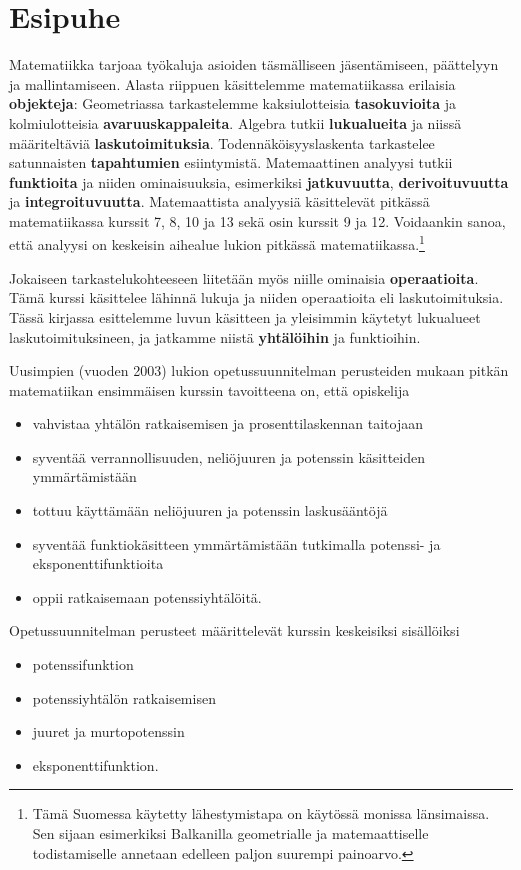 
\chapter{Esipuhe}

Matematiikka tarjoaa työkaluja asioiden täsmälliseen jäsentämiseen, päättelyyn ja mallintamiseen. Alasta riippuen käsittelemme matematiikassa erilaisia \textbf{objekteja}: Geometriassa tarkastelemme kaksiulotteisia \textbf{tasokuvioita} ja kolmiulotteisia \textbf{avaruuskappaleita}. Algebra tutkii \textbf{lukualueita} ja niissä määriteltäviä \textbf{laskutoimituksia}. Todennäköisyyslaskenta tarkastelee satunnaisten \textbf{tapahtumien} esiintymistä. Matemaattinen analyysi tutkii \textbf{funktioita} ja niiden ominaisuuksia, esimerkiksi \textbf{jatkuvuutta}, \textbf{derivoituvuutta} ja \textbf{integroituvuutta}. Matemaattista analyysiä käsittelevät pitkässä matematiikassa kurssit 7, 8, 10 ja 13 sekä osin kurssit 9 ja 12. Voidaankin sanoa, että analyysi on keskeisin aihealue lukion pitkässä matematiikassa.\footnote[1]{Tämä Suomessa käytetty lähestymistapa on käytössä monissa länsimaissa. Sen sijaan esimerkiksi Balkanilla geometrialle ja matemaattiselle todistamiselle annetaan edelleen paljon suurempi painoarvo.}

Jokaiseen tarkastelukohteeseen liitetään myös niille ominaisia \textbf{operaatioita}. Tämä kurssi käsittelee lähinnä lukuja ja niiden operaatioita eli laskutoimituksia. Tässä kirjassa esittelemme luvun käsitteen ja yleisimmin käytetyt lukualueet laskutoimituksineen, ja jatkamme niistä \textbf{yhtälöihin} ja funktioihin.

Uusimpien (vuoden 2003) lukion opetussuunnitelman perusteiden mukaan pitkän matematiikan ensimmäisen kurssin tavoitteena on, että opiskelija
\begin{itemize}
\item vahvistaa yhtälön ratkaisemisen ja prosenttilaskennan taitojaan
\item syventää verrannollisuuden, neliöjuuren ja potenssin käsitteiden ymmärtämistään
\item tottuu käyttämään neliöjuuren ja potenssin laskusääntöjä
\item syventää funktiokäsitteen ymmärtämistään tutkimalla potenssi- ja eksponenttifunktioita
\item oppii ratkaisemaan potenssiyhtälöitä.
\end{itemize}

Opetussuunnitelman perusteet määrittelevät kurssin keskeisiksi sisällöiksi
\begin{itemize}
\item potenssifunktion
\item potenssiyhtälön ratkaisemisen
\item juuret ja murtopotenssin
\item eksponenttifunktion.
\end{itemize}
